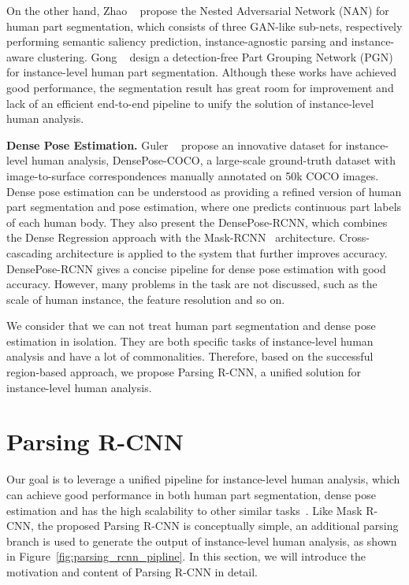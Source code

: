 \documentclass[10pt,twocolumn,letterpaper]{article}
\begin{document}
On the other hand, Zhao \etal~\cite{Zhao_mm2018_mhpv2} propose the Nested Adversarial Network (NAN) for human part segmentation, which consists of three GAN-like sub-nets, respectively performing semantic saliency prediction, instance-agnostic parsing and instance-aware clustering. Gong \etal~\cite{Gong_eccv2018_pgn} design a detection-free Part Grouping Network (PGN) for instance-level human part segmentation. Although these works have achieved good performance, the segmentation result has great room for improvement and lack of an efficient end-to-end pipeline to unify the solution of instance-level human analysis.

\vspace{6pt}
\noindent\textbf{Dense Pose Estimation.} Guler \etal~\cite{Guler_cvpr2018_densepose} propose an innovative dataset for instance-level human analysis, DensePose-COCO, a large-scale ground-truth dataset with image-to-surface correspondences manually annotated on 50k COCO images. Dense pose estimation can be understood as providing a refined version of human part segmentation and pose estimation, where one predicts continuous part labels of each human body. They also present the DensePose-RCNN, which combines the Dense Regression approach with the Mask-RCNN~\cite{He_iccv2017_maskrcnn} architecture. Cross-cascading architecture is applied to the system that further improves accuracy. DensePose-RCNN gives a concise pipeline for dense pose estimation with good accuracy. However, many problems in the task are not discussed, such as the scale of human instance, the feature resolution and so on.

We consider that we can not treat human part segmentation and dense pose estimation in isolation. They are both specific tasks of instance-level human analysis and have a lot of commonalities. Therefore, based on the successful region-based approach, we propose Parsing R-CNN, a unified solution for instance-level human analysis.

\section{Parsing R-CNN}
\label{sec:prcnn}

Our goal is to leverage a unified pipeline for instance-level human analysis, which can achieve good performance in both human part segmentation, dense pose estimation and has the high scalability to other similar tasks~\cite{Gkioxari_cvpr2018_interacnet, Rohit_cvpr2018_dandt}. Like Mask R-CNN, the proposed Parsing R-CNN is conceptually simple, an additional parsing branch is used to generate the output of instance-level human analysis, as shown in Figure~\ref{fig:parsing_rcnn_pipline}. In this section, we will introduce the motivation and content of Parsing R-CNN in detail.
\end{document}
